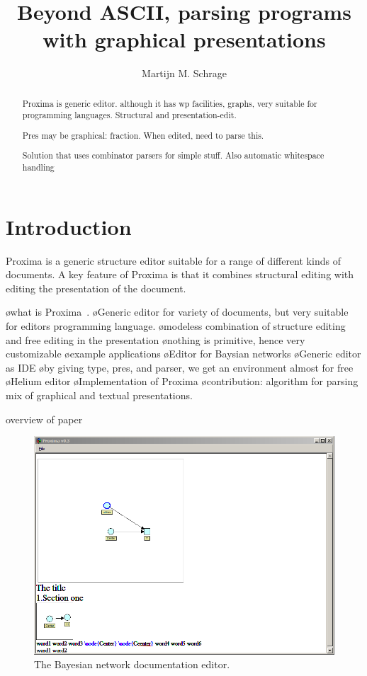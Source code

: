 \documentclass[12pt]{article}
\title{Beyond ASCII, parsing programs with graphical presentations \\{\small \version}}
\author{Martijn M. Schrage\inst{1}}
\begin{document}
 

\maketitle

\begin{abstract}
Proxima is generic editor. although it has wp facilities, graphs, very suitable for programming languages. Structural and presentation-edit.

Pres may be graphical: fraction. When edited, need to parse this.

Solution that uses combinator parsers for simple stuff. Also automatic whitespace handling
\end{abstract}
     
\section{Introduction}

Proxima is a generic structure editor suitable for a range of different kinds of documents. A key feature of Proxima is that it combines structural editing with editing the presentation of the document. 


\bl
\o what is Proxima~\cite{schrage04Proxima}.
\o Generic editor for variety of documents, but very suitable for editors programming language.
\o modeless combination of structure editing and free editing in the presentation
\o nothing is primitive, hence very customizable
\o example applications
\o Editor for Baysian networks
\o Generic editor as IDE
\o by giving type, pres, and parser, we get an environment almost for free
\o Helium editor
\o Implementation of Proxima
\el
\bl
\o contribution: algorithm for parsing mix of graphical and textual presentations.
\el

overview of paper 
\bc
\begin{figure}[ht]
\centering
\includegraphics[width=\textwidth]{images/screenshots/BayesDocEditor}
\caption{The Bayesian network documentation editor.}
\label{fig:bayesEditor}
\end{figure}
\ec
\end{document}
